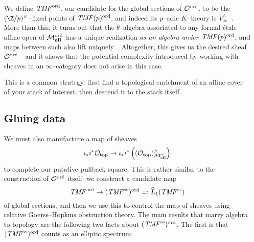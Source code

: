 We define \(\mathit{TMF}^{\mathrm{ord}}\), our candidate for the global sections of \(\mathcal{O}^{\mathrm{ord}}\), to be the \((\Z/p)^\times\)--fixed points of \(\mathit{TMF}(p)^{\mathrm{ord}}\), and indeed its \(p\)--adic \(K\)--theory is \(V^\wedge_\infty\)~\cite[Lemma 7.9]{BehrensConstruction}.  More than this, it turns out that the \(\theta\)--algebra associated to any formal \'etale affine open of \(\mathcal{M}_{\mathbf{ell}}^{\mathrm{ord}}\) has a unique realization \emph{as an algebra under \(\mathit{TMF}(p)^{\mathrm{ord}}\)}, and maps between such also lift uniquely~\cite[Section 7, Step 2]{BehrensConstruction}.  Altogether, this gives us the desired sheaf \(\mathcal{O}^{\mathrm{ord}}\)---and it shows that the potential complexity introduced by working with sheaves in an \(\infty\)--category does not arise in this case.

\begin{remark}
This is a common strategy: first find a topological enrichment of an affine cover of your stack of interest, then descend it to the stack itself.
\end{remark}





\subsection*{Gluing data}

We must also manufacture a map of sheaves \[i_* i^* \mathcal{O}_{\mathrm{top}} \to i_* i^* \left((\mathcal{O}_{\mathrm{top}})^\wedge_{\mathcal{M}_{\mathbf{ell}}^{\mathrm{ss}}}\right)\] to complete our putative pullback square.  This is rather similar to the construction of \(\mathcal{O}^{\mathrm{ord}}\) itself: we construct a candidate map \[\mathit{TMF}^{\mathrm{ord}} \to (\mathit{TMF}^{\mathrm{ss}})^{\mathrm{ord}} =: \widehat L_1 (\mathit{TMF}^{\mathrm{ss}})\] of global sections, and then we use this to control the map of sheaves using relative Goerss--Hopkins obstruction theory.  The main results that marry algebra to topology are the following two facts about \((\mathit{TMF}^{\mathrm{ss}})^{\mathrm{ord}}\).  The first is that \((\mathit{TMF}^{\mathrm{ss}})^{\mathrm{ord}}\) counts as an elliptic spectrum:

